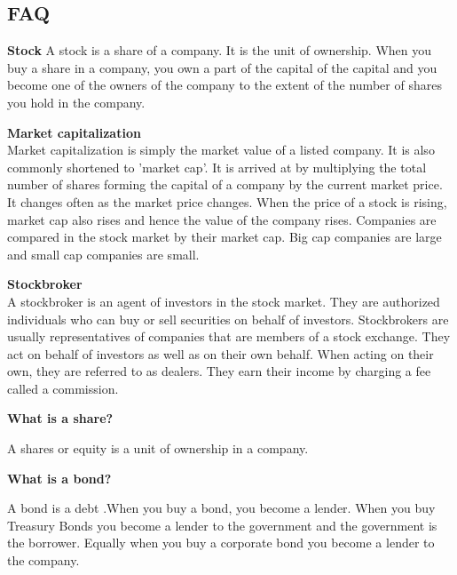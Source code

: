 \documentclass{article}
\begin{document}
\begin{titlepage}
\begin{titlepage}
\begin{flushleft}
\begin{flushleft}
\section{\textbf{\huge{FAQ}}}
\vspace{0.2cm}

\textbf{Stock}
A stock is a share of a company. It is the unit of ownership. When you buy a share in a company, you own a part of the capital of the capital and you become one of the owners of the company to the extent of the number of shares you hold in the company.
\vspace{0.2cm}

\textbf{Market capitalization}
\\

Market capitalization is simply the market value of a listed company. It is also commonly shortened to 'market cap'. It is arrived at by multiplying the total number of shares forming the capital of a company by the current market price. It changes often as the market price changes. When the price of a stock is rising, market cap also rises and hence the value of the company rises. Companies are compared in the stock market by their market cap. Big cap companies are large and small cap companies are small.
\vspace{0.2cm}

\textbf{Stockbroker}
\\

A stockbroker is an agent of investors in the stock market. They are authorized individuals who can buy or sell securities on behalf of investors. Stockbrokers are usually representatives of companies that are members of a stock exchange.  They act on behalf of investors as well as on their own behalf. When acting on their own, they are referred to as dealers. They earn their income by charging a fee called a commission.
\vspace{0.2cm}

\textbf{What is a share?}
\vspace{0.2cm}

A shares or equity is a unit of ownership in a company.
\vspace{0.3cm}

\textbf{What is a bond?}
\vspace{0.2cm}

A bond is a debt .When you buy a bond, you become a lender. When you buy Treasury Bonds you become a lender to the government and the government is the borrower. Equally when you buy a corporate bond you become a lender to the company. 


\end{flushleft}
\end{flushleft}
\end{titlepage}
\end{titlepage}
\end{document}
